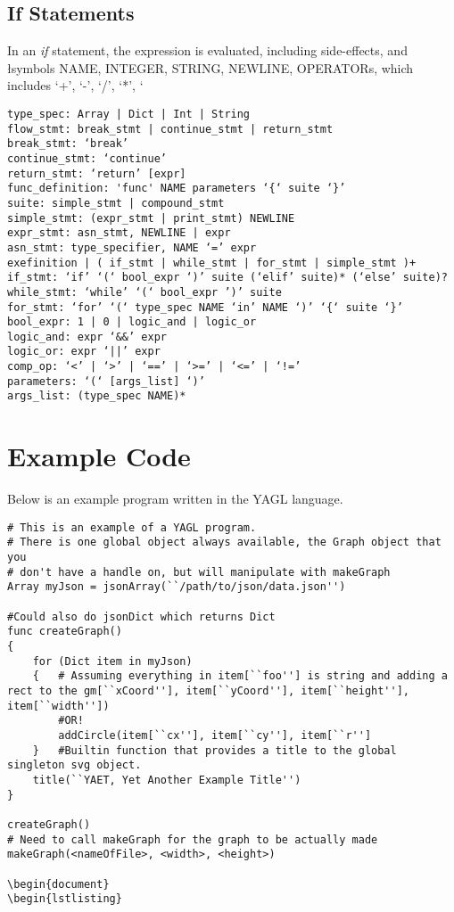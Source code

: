 \documentclass[12pt]{article}
\begin{document}
\subsection{If Statements}

In an \textit{if} statement, the expression is evaluated, including side-effects, and \l symbols NAME, INTEGER, STRING, NEWLINE, OPERATORs, which includes ‘+’, ‘-’, ‘/’, ‘*’, ‘%

\begin{lstlisting}
type_spec: Array | Dict | Int | String
flow_stmt: break_stmt | continue_stmt | return_stmt
break_stmt: ‘break’
continue_stmt: ‘continue’
return_stmt: ‘return’ [expr]
func_definition: 'func' NAME parameters ‘{‘ suite ‘}’
suite: simple_stmt | compound_stmt
simple_stmt: (expr_stmt | print_stmt) NEWLINE
expr_stmt: asn_stmt, NEWLINE | expr 
asn_stmt: type_specifier, NAME ‘=’ expr
exefinition | ( if_stmt | while_stmt | for_stmt | simple_stmt )+
if_stmt: ‘if’ ‘(‘ bool_expr ‘)’ suite (‘elif’ suite)* (‘else’ suite)?
while_stmt: ‘while’ ‘(‘ bool_expr ’)’ suite
for_stmt: ‘for’ ‘(‘ type_spec NAME ‘in’ NAME ‘)’ ‘{‘ suite ‘}’
bool_expr: 1 | 0 | logic_and | logic_or 
logic_and: expr ‘&&’ expr 
logic_or: expr ‘||’ expr 
comp_op: ‘<’ | ‘>’ | ‘==’ | ‘>=’ | ‘<=’ | ‘!=’
parameters: ‘(‘ [args_list] ‘)’
args_list: (type_spec NAME)*
\end{lstlisting}


\section{Example Code}
Below is an example program written in the YAGL language.

\begin{lstlisting}
# This is an example of a YAGL program. 
# There is one global object always available, the Graph object that you 
# don't have a handle on, but will manipulate with makeGraph
Array myJson = jsonArray(``/path/to/json/data.json'')

#Could also do jsonDict which returns Dict 
func createGraph()
{
    for (Dict item in myJson)
    {   # Assuming everything in item[``foo''] is string and adding a rect to the gm[``xCoord''], item[``yCoord''], item[``height''], item[``width''])
        #OR!
        addCircle(item[``cx''], item[``cy''], item[``r'']
    }   #Builtin function that provides a title to the global singleton svg object. 
    title(``YAET, Yet Another Example Title'')
}

createGraph()
# Need to call makeGraph for the graph to be actually made
makeGraph(<nameOfFile>, <width>, <height>)

\begin{document}
\begin{lstlisting}
\end{lstlisting}
\end{document}
